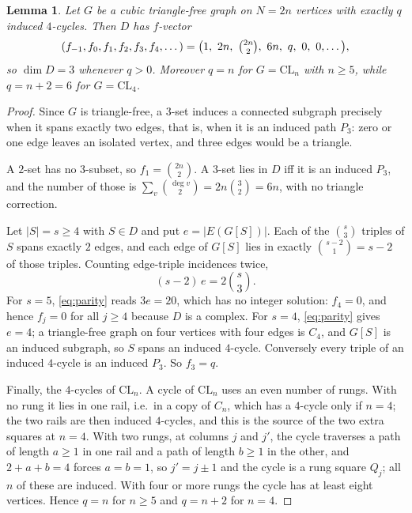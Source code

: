 \documentclass[11pt]{amsart}
\newtheorem{lemma}[theorem]{Lemma}
\theoremstyle{definition}
\newcommand{\CL}{\mathrm{CL}}
\begin{document}
\begin{lemma}\label{lem:fvec}
Let $G$ be a cubic triangle-free graph on $N=2n$ vertices with exactly $q$ induced $4$-cycles. Then
$D$ has $f$-vector
\[
 (f_{-1},f_0,f_1,f_2,f_3,f_4,\dots)=\bigl(1,\ 2n,\ \tbinom{2n}{2},\ 6n,\ q,\ 0,\ 0,\dots\bigr),
\]
so $\dim D=3$ whenever $q>0$. Moreover $q=n$ for $G=\CL_n$ with $n\ge5$, while $q=n+2=6$ for
$G=\CL_4$.
\end{lemma}

\begin{proof}
Since $G$ is triangle-free, a $3$-set induces a connected subgraph precisely when it spans exactly
two edges, that is, when it is an induced path $P_3$: zero or one edge leaves an isolated vertex, and
three edges would be a triangle.

A $2$-set has no $3$-subset, so $f_1=\binom{2n}{2}$. A $3$-set lies in $D$ iff it is an induced
$P_3$, and the number of those is $\sum_{v}\binom{\deg v}{2}=2n\binom32=6n$, with no triangle
correction.

Let $|S|=s\ge4$ with $S\in D$ and put $e=|E(G[S])|$. Each of the $\binom s3$ triples of $S$ spans
exactly $2$ edges, and each edge of $G[S]$ lies in exactly $\binom{s-2}{1}=s-2$ of those triples.
Counting edge-triple incidences twice,
\begin{equation}\label{eq:parity}
 (s-2)\,e=2\binom s3 .
\end{equation}
For $s=5$, \eqref{eq:parity} reads $3e=20$, which has no integer solution: $f_4=0$, and hence
$f_j=0$ for all $j\ge4$ because $D$ is a complex. For $s=4$, \eqref{eq:parity} gives $e=4$; a
triangle-free graph on four vertices with four edges is $C_4$, and $G[S]$ is an induced subgraph, so
$S$ spans an induced $4$-cycle. Conversely every triple of an induced $4$-cycle is an induced $P_3$.
So $f_3=q$.

Finally, the $4$-cycles of $\CL_n$. A cycle of $\CL_n$ uses an even number of rungs. With no rung it
lies in one rail, i.e.\ in a copy of $C_n$, which has a $4$-cycle only if $n=4$; the two rails are
then induced $4$-cycles, and this is the source of the two extra squares at $n=4$. With two rungs, at
columns $j$ and $j'$, the cycle traverses a path of length $a\ge1$ in one rail and a path of length
$b\ge1$ in the other, and $2+a+b=4$ forces $a=b=1$, so $j'=j\pm1$ and the cycle is a rung square
$Q_j$; all $n$ of these are induced. With four or more rungs the cycle has at least eight vertices.
Hence $q=n$ for $n\ge5$ and $q=n+2$ for $n=4$.
\end{proof}
\end{document}
